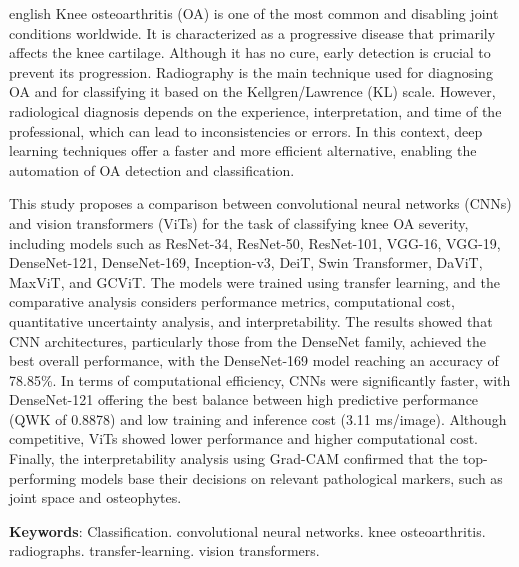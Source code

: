 \begin{resumo}[Abstract]
 \begin{otherlanguage*}{english}
  Knee osteoarthritis (OA) is one of the most common and disabling joint conditions worldwide. It is characterized as a progressive disease that primarily affects the knee cartilage. Although it has no cure, early detection is crucial to prevent its progression. Radiography is the main technique used for diagnosing OA and for classifying it based on the Kellgren/Lawrence (KL) scale. However, radiological diagnosis depends on the experience, interpretation, and time of the professional, which can lead to inconsistencies or errors. In this context, deep learning techniques offer a faster and more efficient alternative, enabling the automation of OA detection and classification.

  This study proposes a comparison between convolutional neural networks (CNNs) and vision transformers (ViTs) for the task of classifying knee OA severity, including models such as ResNet-34, ResNet-50, ResNet-101, VGG-16, VGG-19, DenseNet-121, DenseNet-169, Inception-v3, DeiT, Swin Transformer, DaViT, MaxViT, and GCViT. The models were trained using transfer learning, and the comparative analysis considers performance metrics, computational cost, quantitative uncertainty analysis, and interpretability. The results showed that CNN architectures, particularly those from the DenseNet family, achieved the best overall performance, with the DenseNet-169 model reaching an accuracy of 78.85\%. In terms of computational efficiency, CNNs were significantly faster, with DenseNet-121 offering the best balance between high predictive performance (QWK of 0.8878) and low training and inference cost (3.11 ms/image). Although competitive, ViTs showed lower performance and higher computational cost. Finally, the interpretability analysis using Grad-CAM confirmed that the top-performing models base their decisions on relevant pathological markers, such as joint space and osteophytes.

   \vspace{\onelineskip}
 
   \noindent 
   \textbf{Keywords}: Classification. convolutional neural networks. knee osteoarthritis. radiographs. transfer-learning. vision transformers.
 \end{otherlanguage*}
\end{resumo}